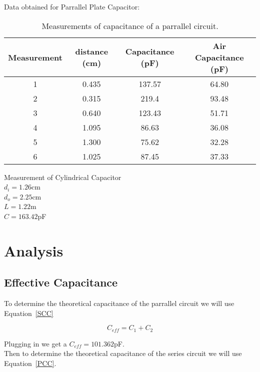 \documentclass[10pt]{article}
\begin{document}
Data obtained for Parrallel Plate Capacitor:
\begin{table}[!h]\label{Table 2}
  \begin{center}
    \begin{tabular}{|c|c|c|c|}
      \hline
      Measurement & distance (cm) & Capacitance (pF) & Air Capacitance (pF) \\
      \hline
      1    &  0.435 & 137.57 &     64.80              \\
      \hline
      2    &  0.315     & 219.4&   93.48 \\
      \hline
      3     &      0.640    & 123.43 &  51.71         \\
      \hline
      4     &    1.095    & 86.63 &     36.08     \\
      \hline
      5     &     1.300   & 75.62 &       32.28   \\
      \hline
      6     &    1.025    & 87.45 &       37.33   \\
      \hline
    \end{tabular}
    \caption[short]{Measurements of capacitance of a parrallel circuit.}
  \end{center}
\end{table}

Measurement of Cylindrical Capacitor\\
$d_{i} = 1.26$cm\\
$d_{o} = 2.25$cm\\
$L = 1.22$m\\
$C = 163.42$pF\\

\section{Analysis}
\subsection*{Effective Capacitance}

To determine the theoretical capacitance of the parrallel 
circuit we will use Equation~\ref*{SCC}

\begin{equation}\label{SCC}
  C_{eff} = C_{1} + C_{2}
\end{equation}

Plugging in we get a $C_{eff} = 101.362$pF.\\
Then to determine the theoretical capacitance of the series 
circuit we will use Equation~\ref*{PCC}.\\
\end{document}
